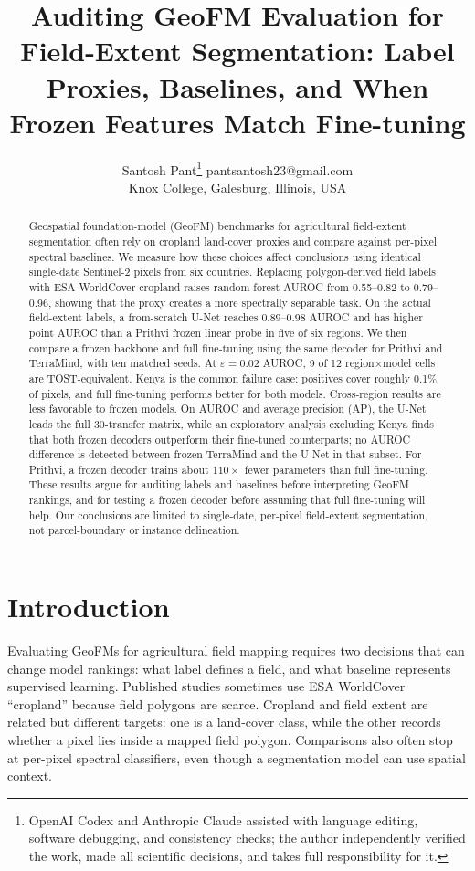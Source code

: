 \documentclass{article}
\title{Auditing GeoFM Evaluation for Field-Extent Segmentation: Label Proxies, Baselines, and When Frozen Features Match Fine-tuning}
\author{
\name Santosh Pant\thanks{OpenAI Codex and Anthropic Claude assisted with language editing, software debugging, and consistency checks; the author independently verified the work, made all scientific decisions, and takes full responsibility for it.}
\email pantsantosh23@gmail.com \\
\addr Knox College, Galesburg, Illinois, USA
}
\begin{document}
\maketitle

\begin{abstract}
Geospatial foundation-model (GeoFM) benchmarks for agricultural field-extent
segmentation often rely on cropland land-cover proxies and compare against per-pixel
spectral baselines. We measure how these choices affect conclusions using identical
single-date Sentinel-2 pixels from six countries. Replacing polygon-derived field labels
with ESA WorldCover cropland raises random-forest AUROC from 0.55--0.82 to 0.79--0.96,
showing that the proxy creates a more spectrally separable task. On the actual
field-extent labels, a from-scratch U-Net reaches 0.89--0.98 AUROC and has higher point
AUROC than a Prithvi frozen linear probe in five of six regions. We then compare a frozen
backbone and full fine-tuning using the same decoder for Prithvi and TerraMind, with ten matched seeds. At
$\varepsilon{=}0.02$ AUROC, 9 of 12 region$\times$model cells are TOST-equivalent.
Kenya is the common failure case: positives cover roughly 0.1\% of pixels, and full
fine-tuning performs better for both models. Cross-region results are less favorable to
frozen models. On AUROC and average precision (AP), the U-Net leads the full 30-transfer matrix, while an exploratory analysis
excluding Kenya finds that both frozen decoders outperform their fine-tuned counterparts;
no AUROC difference is detected between frozen TerraMind and the U-Net in that subset. For
Prithvi, a frozen decoder trains about $110\times$ fewer parameters than full fine-tuning. These results
argue for auditing labels and baselines before interpreting GeoFM rankings, and for
testing a frozen decoder before assuming that full fine-tuning will help. Our conclusions
are limited to single-date, per-pixel field-extent segmentation, not parcel-boundary or
instance delineation.
\end{abstract}

\section{Introduction}
Evaluating GeoFMs for agricultural field mapping requires two decisions that can change
model rankings: what label defines a field, and what baseline represents supervised
learning. Published studies sometimes use ESA WorldCover ``cropland'' because field
polygons are scarce. Cropland and field extent are related but different targets: one is
a land-cover class, while the other records whether a pixel lies inside a mapped field
polygon. Comparisons also often stop at per-pixel spectral classifiers, even though a
segmentation model can use spatial context.
\end{document}
